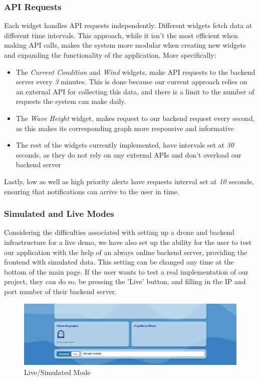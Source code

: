 \documentclass{article}
\begin{document}
    \subsubsection{API Requests}
    Each widget handles API requests independently. Different widgets fetch data at different time intervals. This approach, while it isn't the most efficient when making API calls, makes the system more modular when creating new widgets and expanding the functionality of the application. More specifically:
    \begin{itemize}
        \item The \textit{Current Condition} and \textit{Wind} widgets, make API requests to the backend server every \textit{3} minutes. This is done because our current approach relies on an external API for collecting this data, and there is a limit to the number of requests the system can make daily.
        \item The \textit{Wave Height} widget, makes request to our backend request every second, as this makes its corresponding graph more responsive and informative
        \item The rest of the widgets currently implemented, have intervals set at \textit{30} seconds, as they do not rely on any external APIs and don't overload our backend server
    \end{itemize}
    Lastly, low as well as high priority alerts have requests interval set at \textit{10} seconds, ensuring that notifications can arrive to the user in time.
    
    \subsubsection{Simulated and Live Modes}
    Considering the difficulties associated with setting up a drone and backend infrastructure for a live demo, we have also set up the ability for the user to test our application with the help of an always online backend server, providing the frontend with simulated data. This setting can be changed any time at the bottom of the main page. If the user wants to test a real implementation of our project, they can do so, be pressing the 'Live' button, and filling in the IP and port number of their backend server.
    
    \begin{figure}[H]
        \centering
        \includegraphics[width=1\linewidth]{assets/FE_F5.png}
        \caption{Live/Simulated Mode}
        \label{fig:simulated}
    \end{figure}
\end{document}
